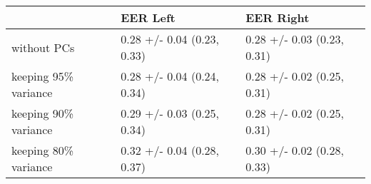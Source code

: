 \begin{tabular}{lll}
\toprule
{} &                    EER Left &                   EER Right \\
\midrule
without PCs          &  0.28 +/- 0.04 (0.23, 0.33) &  0.28 +/- 0.03 (0.23, 0.31) \\
keeping 95\% variance &  0.28 +/- 0.04 (0.24, 0.34) &  0.28 +/- 0.02 (0.25, 0.31) \\
keeping 90\% variance &  0.29 +/- 0.03 (0.25, 0.34) &  0.28 +/- 0.02 (0.25, 0.31) \\
keeping 80\% variance &  0.32 +/- 0.04 (0.28, 0.37) &  0.30 +/- 0.02 (0.28, 0.33) \\
\bottomrule
\end{tabular}
